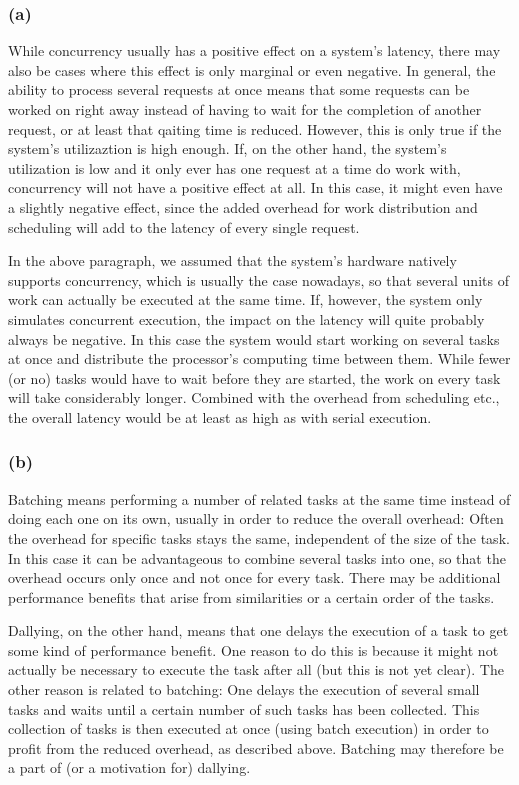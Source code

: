 \documentclass[12pt,a4paper]{article}
\begin{document}
\subsubsection*{(a)}
While concurrency usually has a positive effect on a system's latency, there may also be cases where this effect is only marginal or even negative. In general, the ability to process several requests at once means that some requests can be worked on right away instead of having to wait for the completion of another request, or at least that qaiting time is reduced. However, this is only true if the system's utilizaztion is high enough. If, on the other hand, the system's utilization is low and it only ever has one request at a time do work with, concurrency will not have a positive effect at all. In this case, it might even have a slightly negative effect, since the added overhead for work distribution and scheduling will add to the latency of every single request.

In the above paragraph, we assumed that the system's hardware natively supports concurrency, which is usually the case nowadays, so that several units of work can actually be executed at the same time. If, however, the system only simulates concurrent execution, the impact on the latency will quite probably always be negative. In this case the system would start working on several tasks at once and distribute the processor's computing time between them. While fewer (or no) tasks would have to wait before they are started, the work on every task will take considerably longer. Combined with the overhead from scheduling etc., the overall latency would be at least as high as with serial execution.

\subsubsection*{(b)}
Batching means performing a number of related tasks at the same time instead of doing each one on its own, usually in order to reduce the overall overhead: Often the overhead for specific tasks stays the same, independent of the size of the task. In this case it can be advantageous to combine several tasks into one, so that the overhead occurs only once and not once for every task. There may be additional performance benefits that arise from similarities or a certain order of the tasks. 

Dallying, on the other hand, means that one delays the execution of a task to get some kind of performance benefit. One reason to do this is because it might not actually be necessary to execute the task after all (but this is not yet clear). The other reason is related to batching: One delays the execution of several small tasks and waits until a certain number of such tasks has been collected. This collection of tasks is then executed at once (using batch execution) in order to profit from the reduced overhead, as described above. Batching may therefore be a part of (or a motivation for) dallying.
\end{document}

